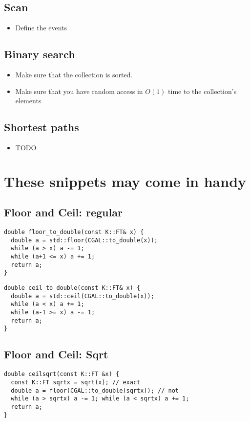 \documentclass[guide.tex]{subfiles}
\begin{document}
\subsection{Scan}
\begin{itemize}
  \item Define the events
\end{itemize}

\subsection{Binary search}
\begin{itemize}
  \item Make sure that the collection is sorted.
  \item Make sure that you have random access in $O(1)$ time to the collection's elements
\end{itemize}

\subsection{Shortest paths}
\begin{itemize}
  \item TODO
\end{itemize}

\section{These snippets may come in handy}

\subsection{Floor and Ceil: regular}
\begin{verbatim}
double floor_to_double(const K::FT& x) {
  double a = std::floor(CGAL::to_double(x));
  while (a > x) a -= 1;
  while (a+1 <= x) a += 1;
  return a;
}
\end{verbatim}

\begin{verbatim}
double ceil_to_double(const K::FT& x) {
  double a = std::ceil(CGAL::to_double(x));
  while (a < x) a += 1;
  while (a-1 >= x) a -= 1;
  return a;
}
\end{verbatim}

\subsection{Floor and Ceil: Sqrt}
\begin{verbatim}
double ceilsqrt(const K::FT &x) {
  const K::FT sqrtx = sqrt(x); // exact
  double a = floor(CGAL::to_double(sqrtx)); // not
  while (a > sqrtx) a -= 1; while (a < sqrtx) a += 1;
  return a;
}
\end{verbatim}
\end{document}

